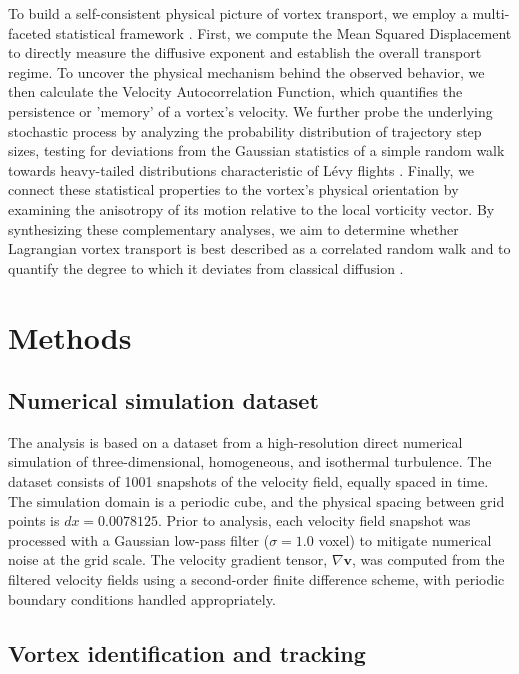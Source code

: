 \documentclass[]{article}
\begin{document}
To build a self-consistent physical picture of vortex transport, we employ a multi-faceted statistical framework \citep{kumar2025trappingtransportinertialparticles,aulnette2025transportsphericalmicroparticles3d}. First, we compute the Mean Squared Displacement to directly measure the diffusive exponent and establish the overall transport regime. To uncover the physical mechanism behind the observed behavior, we then calculate the Velocity Autocorrelation Function, which quantifies the persistence or 'memory' of a vortex's velocity. We further probe the underlying stochastic process by analyzing the probability distribution of trajectory step sizes, testing for deviations from the Gaussian statistics of a simple random walk towards heavy-tailed distributions characteristic of Lévy flights \citep{kumar2025trappingtransportinertialparticles}. Finally, we connect these statistical properties to the vortex's physical orientation by examining the anisotropy of its motion relative to the local vorticity vector. By synthesizing these complementary analyses, we aim to determine whether Lagrangian vortex transport is best described as a correlated random walk and to quantify the degree to which it deviates from classical diffusion \citep{kumar2025trappingtransportinertialparticles,aulnette2025transportsphericalmicroparticles3d}.

\section{Methods}
\label{sec:methods}
\subsection{Numerical simulation dataset}

The analysis is based on a dataset from a high-resolution direct numerical simulation of three-dimensional, homogeneous, and isothermal turbulence. The dataset consists of 1001 snapshots of the velocity field, equally spaced in time. The simulation domain is a periodic cube, and the physical spacing between grid points is $dx=0.0078125$. Prior to analysis, each velocity field snapshot was processed with a Gaussian low-pass filter ($\sigma=1.0$ voxel) to mitigate numerical noise at the grid scale. The velocity gradient tensor, $\nabla \mathbf{v}$, was computed from the filtered velocity fields using a second-order finite difference scheme, with periodic boundary conditions handled appropriately.

\subsection{Vortex identification and tracking}
\end{document}
